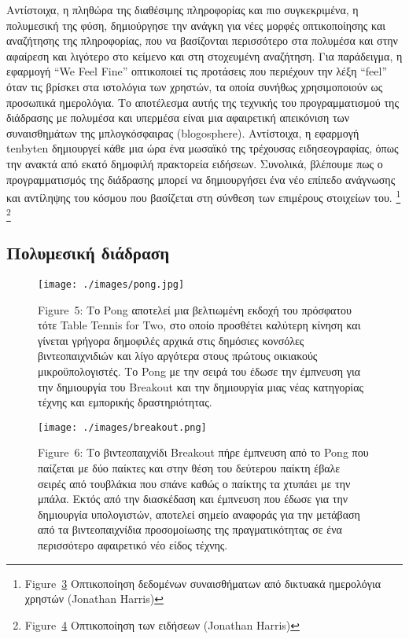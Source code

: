 \documentclass[
]{article}
\begin{document}
Αντίστοιχα, η πληθώρα της διαθέσιμης πληροφορίας και πιο συγκεκριμένα, η
πολυμεσική της φύση, δημιούργησε την ανάγκη για νέες μορφές
οπτικοποίησης και αναζήτησης της πληροφορίας, που να βασίζονται
περισσότερο στα πολυμέσα και στην αφαίρεση και λιγότερο στο κείμενο και
στη στοχευμένη αναζήτηση. Για παράδειγμα, η εφαρμογή ``We Feel Fine''
οπτικοποιεί τις προτάσεις που περιέχουν την λέξη ``feel'' όταν τις
βρίσκει στα ιστολόγια των χρηστών, τα οποία συνήθως χρησιμοποιούν ως
προσωπικά ημερολόγια. Το αποτέλεσμα αυτής της τεχνικής του
προγραμματισμού της διάδρασης με πολυμέσα και υπερμέσα είναι μια
αφαιρετική απεικόνιση των συναισθημάτων της μπλογκόσφαιρας
(blogosphere). Αντίστοιχα, η εφαρμογή tenbyten δημιουργεί κάθε μια ώρα
ένα μωσαϊκό της τρέχουσας ειδησεογραφίας, όπως την ανακτά από εκατό
δημοφιλή πρακτορεία ειδήσεων. Συνολικά, βλέπουμε πως ο προγραμματισμός
της διάδρασης μπορεί να δημιουργήσει ένα νέο επίπεδο ανάγνωσης και
αντίληψης του κόσμου που βασίζεται στη σύνθεση των επιμέρους στοιχείων
του. \footnote{Figure~\protect\hyperlink{fig:we-feel-fine}{3}
  Οπτικοποίηση δεδομένων συναισθήματων από δικτυακά ημερολόγια χρηστών
  (Jonathan Harris)} \footnote{Figure~\protect\hyperlink{fig:tenbyten}{4}
  Οπτικοποίηση των ειδήσεων (Jonathan Harris)}

\hypertarget{ux3c0ux3bfux3bbux3c5ux3bcux3b5ux3c3ux3b9ux3baux3ae-ux3b4ux3b9ux3acux3b4ux3c1ux3b1ux3c3ux3b7}{%
\subsection{Πολυμεσική
διάδραση}\label{ux3c0ux3bfux3bbux3c5ux3bcux3b5ux3c3ux3b9ux3baux3ae-ux3b4ux3b9ux3acux3b4ux3c1ux3b1ux3c3ux3b7}}

\leavevmode{}%
\begin{figure}
\hypertarget{fig:pong}{%
\centering
\texttt{[image: ./images/pong.jpg]}
\caption{Figure~5: Το Pong αποτελεί μια βελτιωμένη εκδοχή του πρόσφατου
τότε Table Tennis for Two, στο οποίο προσθέτει καλύτερη κίνηση και
γίνεται γρήγορα δημοφιλές αρχικά στις δημόσιες κονσόλες βιντεοπαιχνιδιών
και λίγο αργότερα στους πρώτους οικιακούς μικροϋπολογιστές. Tο Pong με
την σειρά του έδωσε την έμπνευση για την δημιουργία του Breakout και την
δημιουργία μιας νέας κατηγορίας τέχνης και εμπορικής
δραστηριότητας.}\label{fig:pong}
}
\end{figure}

\leavevmode{}%
\begin{figure}
\hypertarget{fig:breakout}{%
\centering
\texttt{[image: ./images/breakout.png]}
\caption{Figure~6: Το βιντεοπαιχνίδι Breakout πήρε έμπνευση από το Pong
που παίζεται με δύο παίκτες και στην θέση του δεύτερου παίκτη έβαλε
σειρές από τουβλάκια που σπάνε καθώς ο παίκτης τα χτυπάει με την μπάλα.
Εκτός από την διασκέδαση και έμπνευση που έδωσε για την δημιουργία
υπολογιστών, αποτελεί σημείο αναφοράς για την μετάβαση από τα
βιντεοπαιχνίδια προσομοίωσης της πραγματικότητας σε ένα περισσότερο
αφαιρετικό νέο είδος τέχνης.}\label{fig:breakout}
}
\end{figure}
\end{document}
